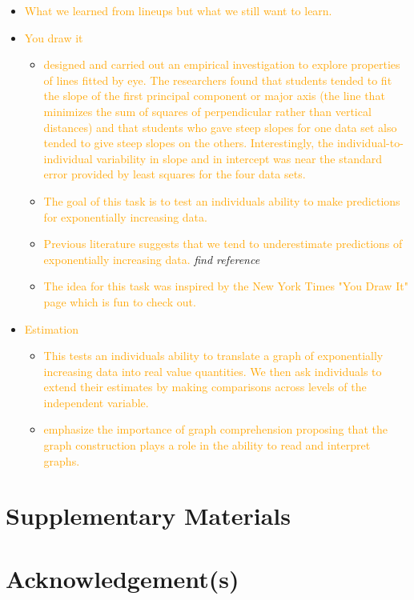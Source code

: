 \documentclass[]{interact}
\theoremstyle{plain}%
\theoremstyle{definition}
\theoremstyle{remark}
\begin{document}
\begin{itemize}
\item
  \textcolor{Orange}{What we learned from lineups but what we still want to learn.}
\item
  \textcolor{Orange}{You draw it}

  \begin{itemize}
  \item
    \citet{mosteller_eye_1981}
    \textcolor{Orange}{designed and carried out an empirical investigation to explore properties of lines fitted by eye. The researchers found that students tended to fit the slope of the first principal component or major axis (the line that minimizes the sum of squares of perpendicular rather than vertical distances) and that students who gave steep slopes for one data set also tended to give steep slopes on the others. Interestingly, the individual-to-individual variability in slope and in intercept was near the standard error provided by least squares for the four data sets.}
  \item
    \textcolor{Orange}{The goal of this task is to test an individuals ability to make predictions for exponentially increasing data.}
  \item
    \textcolor{Orange}{Previous literature suggests that we tend to underestimate predictions of exponentially increasing data.}
    \emph{find reference}
  \item
    \textcolor{Orange}{The idea for this task was inspired by the New York Times "You Draw It" page which is fun to check out.}
  \end{itemize}
\item
  \textcolor{Orange}{Estimation}

  \begin{itemize}
  \item
    \textcolor{Orange}{This tests an individuals ability to translate a graph of exponentially increasing data into real value quantities. We then ask individuals to extend their estimates by making comparisons across levels of the independent variable.}
  \item
    \citet{friel_making_2001}
    \textcolor{Orange}{emphasize the importance of graph comprehension proposing that the graph construction plays a role in the ability to read and interpret graphs.}
  \end{itemize}
\end{itemize}

\hypertarget{supplementary-materials}{%
\section*{Supplementary Materials}\label{supplementary-materials}}

\hypertarget{acknowledgements}{%
\section*{Acknowledgement(s)}\label{acknowledgements}}



\end{document}
